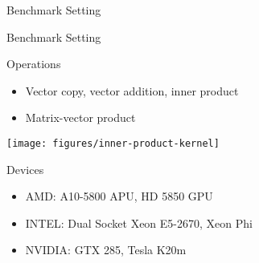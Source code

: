 \begin{frame}[fragile]{Benchmark Setting}

\end{frame}


\begin{frame}{Benchmark Setting}

  \begin{block}{Operations}
   \begin{itemize}
    \item Vector copy, vector addition, inner product
    \item Matrix-vector product
   \end{itemize}
  \end{block}


  \begin{center} \texttt{[image: figures/inner-product-kernel]} \end{center}

  \begin{block}{Devices}
   \begin{itemize}
    \item AMD: A10-5800 APU, HD 5850 GPU
    \item INTEL: Dual Socket Xeon E5-2670, Xeon Phi
    \item NVIDIA: GTX 285, Tesla K20m
   \end{itemize}
  \end{block}
  
\end{frame}
